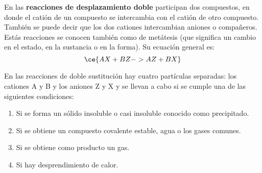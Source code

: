 \begin{warncard}[adjusted title={Reacciones de desplazamiento doble}]
    En las \textbf{reacciones de desplazamiento doble} participan dos compuestos, en donde el catión de un compuesto se intercambia con el catión de otro compuesto. También se puede decir que los dos cationes intercambian aniones o compañeros. Estás reacciones se conocen también como de metátesis (que significa un cambio en el estado, en la sustancia o en la forma). Su ecuación general es:
    \[\ce{AX + BZ -> AZ + BX}\]

    En las reacciones de doble sustitución hay cuatro partículas separadas: los cationes A y B y los aniones Z y X y se llevan a cabo si se cumple una de las siguientes condiciones:

    \begin{enumerate}
        \item Si se forma un sólido insoluble o casi insoluble conocido como precipitado.
        \item Si se obtiene un compuesto covalente estable, agua o los gases comunes.
        \item Si se obtiene como producto un gas.
        \item Si hay desprendimiento de calor.
    \end{enumerate}
\end{warncard}